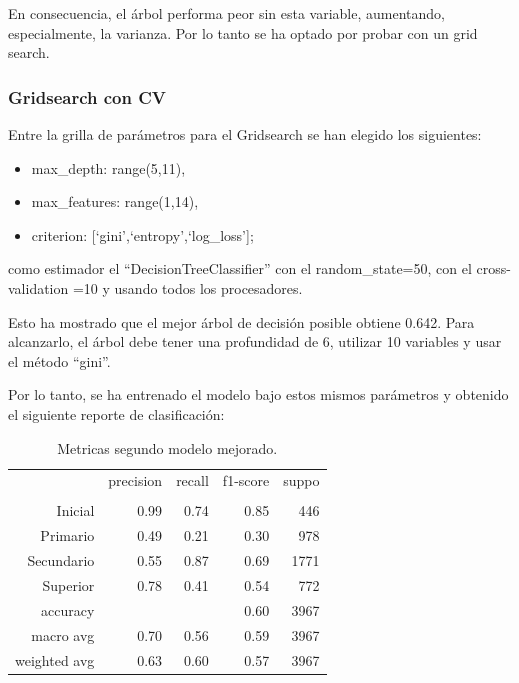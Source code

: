 \documentclass[a4paper]{article}
\begin{document}
            En consecuencia, el árbol performa peor sin esta variable, aumentando, especialmente, la varianza. Por lo tanto se ha optado por probar con un grid search.
        
        \subsubsection{Gridsearch con CV}
            
            Entre la grilla de parámetros para el Gridsearch se han elegido los siguientes:
            \begin{itemize}
                \item max\_depth: range(5,11),
                \item max\_features: range(1,14),
                \item criterion: [`gini',`entropy',`log\_loss'];
            \end{itemize}
            como estimador el ``DecisionTreeClassifier'' con el random\_state=50, con el cross-validation =10 y usando todos los procesadores.
            
\vspace{1cm}

           Esto ha mostrado que el mejor árbol de decisión posible obtiene 0.642. Para alcanzarlo, el árbol debe tener una profundidad de  6, utilizar  10  variables y usar el método ``gini''.

            Por lo tanto, se ha entrenado el modelo bajo estos mismos parámetros y obtenido el siguiente reporte de clasificación:

            \begin{table}[H]
                \centering
                \begin{tabular}{rrrrr}
                    ~ & precision & recall & f1-score & suppo \\
                    & & & & \\
                    Inicial    & 0.99 & 0.74 & 0.85 & 446 \\
                    Primario   & 0.49 & 0.21 & 0.30 & 978 \\
                    Secundario & 0.55 & 0.87 & 0.69 & 1771 \\
                    Superior   & 0.78 & 0.41 & 0.54 & 772 \\
                    accuracy & & & 0.60 & 3967 \\
                    macro avg & 0.70 & 0.56 & 0.59 & 3967 \\
                    weighted avg & 0.63 & 0.60 & 0.57 & 3967 \\
                \end{tabular}
                \caption{Metricas segundo modelo mejorado.}
                \label{New Second model metrics}
            \end{table}
\end{document}
